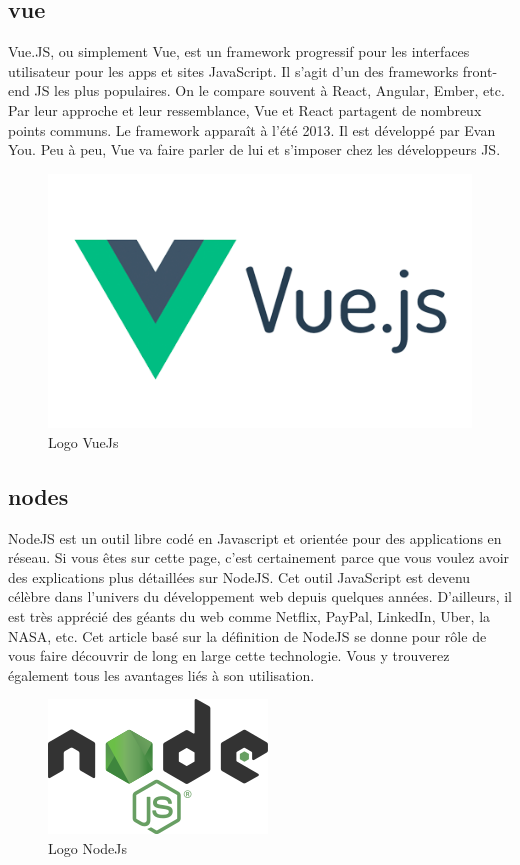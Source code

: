 \subsection{vue}
Vue.JS, ou simplement Vue, est un framework progressif pour les interfaces utilisateur pour les apps et sites JavaScript. Il s’agit d’un des frameworks front-end JS les plus populaires. On le compare souvent à React, Angular, Ember, etc. Par leur approche et leur ressemblance, Vue et React partagent de nombreux points communs. Le framework apparaît à l’été 2013. Il est développé par Evan You. Peu à peu, Vue va faire parler de lui et s’imposer chez les développeurs JS.
\begin{figure}[h]
	\centering
    \includegraphics[scale=0.3]{img/part3/4.2}
    \caption{Logo VueJs}
\end{figure}

\newpage
\subsection{nodes}
NodeJS est un outil libre codé en Javascript et orientée pour des applications en réseau. Si vous êtes sur cette page, c’est certainement parce que vous voulez avoir des explications plus détaillées sur NodeJS. Cet outil JavaScript est devenu célèbre dans l’univers du développement web depuis quelques années. D’ailleurs, il est très apprécié des géants du web comme Netflix, PayPal, LinkedIn, Uber, la NASA, etc. Cet article basé sur la définition de NodeJS se donne pour rôle de vous faire découvrir de long en large cette technologie. Vous y trouverez également tous les avantages liés à son utilisation.
\begin{figure}[h]
	\centering
    \includegraphics[scale=0.4]{img/part3/4.3}
    \caption{Logo NodeJs}
\end{figure}

